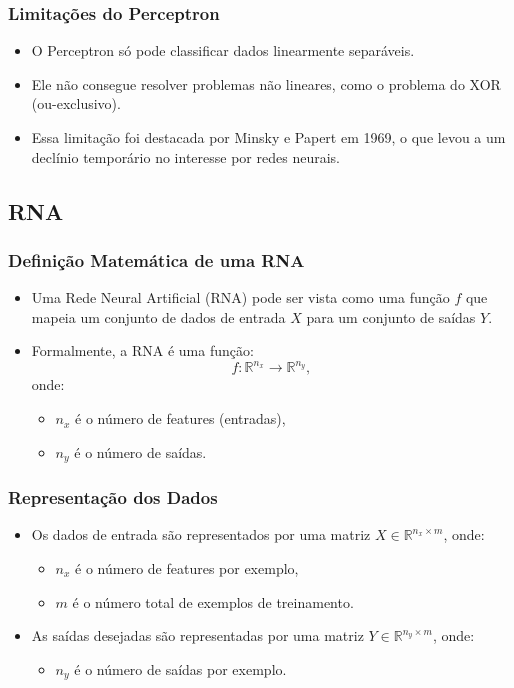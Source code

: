 \documentclass{beamer}
\begin{document}
\begin{frame}
\frametitle{Limitações do Perceptron}
\begin{itemize}
    \item O Perceptron só pode classificar dados linearmente separáveis.
    \item Ele não consegue resolver problemas não lineares, como o problema do XOR (ou-exclusivo).
    \item Essa limitação foi destacada por Minsky e Papert em 1969, o que levou a um declínio temporário no interesse por redes neurais.
\end{itemize}
\end{frame}
\subsection{RNA}
\begin{frame}
\frametitle{Definição Matemática de uma RNA}
\begin{itemize}
    \item Uma Rede Neural Artificial (RNA) pode ser vista como uma função \( f \) que mapeia um conjunto de dados de entrada \( X \) para um conjunto de saídas \( Y \).
    \item Formalmente, a RNA é uma função:
    \[
    f: \mathbb{R}^{n_x} \to \mathbb{R}^{n_y},
    \]
    onde:
    \begin{itemize}
        \item \( n_x \) é o número de features (entradas),
        \item \( n_y \) é o número de saídas.
    \end{itemize}
\end{itemize}
\end{frame}

\begin{frame}
\frametitle{Representação dos Dados}
\begin{itemize}
    \item Os dados de entrada são representados por uma matriz \( X \in \mathbb{R}^{n_x \times m} \), onde:
    \begin{itemize}
        \item \( n_x \) é o número de features por exemplo,
        \item \( m \) é o número total de exemplos de treinamento.
    \end{itemize}
    \item As saídas desejadas são representadas por uma matriz \( Y \in \mathbb{R}^{n_y \times m} \), onde:
    \begin{itemize}
        \item \( n_y \) é o número de saídas por exemplo.
    \end{itemize}
\end{itemize}
\end{frame}
\end{document}
